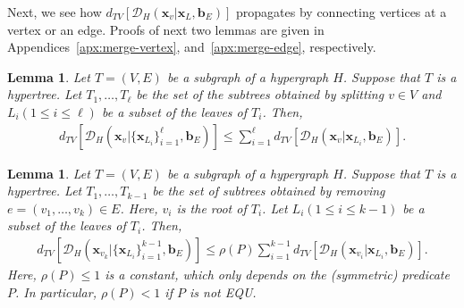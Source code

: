 \documentclass[letterpaper,11pt]{article}
\newtheorem{lemma}[theorem]{Lemma}
\newcommand{\dtv}{d_{TV}}
\newcommand{\cald}{\mathcal{D}}
\newcommand{\bfx}{\mathbf{x}}
\newcommand{\bfb}{\mathbf{b}}
\newcommand{\equ}{\textsf{EQU}\xspace}
\begin{document}
Next, we see how $\dtv[\cald_H(\bfx_v|\bfx_L,\bfb_E)]$ propagates by connecting vertices at a vertex or an edge.
Proofs of next two lemmas are given in Appendices~\ref{apx:merge-vertex}, and~\ref{apx:merge-edge}, respectively.
\begin{lemma}\label{lmm:merge-vertex}
  Let $T=(V,E)$ be a subgraph of a hypergraph $H$.
  Suppose that $T$ is a hypertree.
  Let $T_1,\ldots,T_\ell$ be the set of the subtrees obtained by splitting $v\in V$ and $L_i (1\leq i\leq \ell)$ be a subset of the leaves of $T_i$.
  Then,
  \begin{eqnarray*}
    \dtv[\cald_H(\bfx_v|\{\bfx_{L_i}\}_{i=1}^\ell,\bfb_E)] \leq \sum_{i=1}^{\ell}\dtv[\cald_H(\bfx_v|\bfx_{L_i},\bfb_E)].
  \end{eqnarray*}
\end{lemma}
\begin{lemma}\label{lmm:merge-edge}
  Let $T=(V,E)$ be a subgraph of a hypergraph $H$.
  Suppose that $T$ is a hypertree.
  Let $T_1,\ldots,T_{k-1}$ be the set of subtrees obtained by removing $e=(v_1,\ldots,v_k)\in E$.
  Here, $v_i$ is the root of $T_i$.
  Let $L_i(1\leq i\leq k-1)$ be a subset of the leaves of $T_i$.
  Then,
  \begin{eqnarray*}
    \dtv[\cald_H(\bfx_{v_k}|\{\bfx_{L_i}\}_{i=1}^{k-1},\bfb_E)]\leq \rho(P)\sum_{i=1}^{k-1}\dtv[\cald_H(\bfx_{v_i}|\bfx_{L_i},\bfb_E)].
  \end{eqnarray*}
  Here, $\rho(P)\leq 1$ is a constant, which only depends on the (symmetric) predicate $P$.
  In particular, $\rho(P)<1$ if $P$ is not \equ.
\end{lemma}
\end{document}
